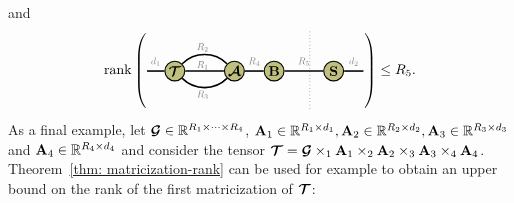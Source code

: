 and
$$
\rank
\left(\begin{tikzpicture}[baseline=-0.5ex]
    \tikzset{tensor/.style = {minimum size = 0.5cm,shape = circle,thick,draw=black,inner sep = 0pt}, edge/.style = {thick,line width=.4mm},every loop/.style={}}
    \def\x{6}
    \def\y{0} \node[tensor,fill=green!50!red!50!white] (T) at (\x+1,\y) {$\Tt$};
    \node[tensor,fill=green!50!red!50!white] (A) at (\x+2.5,\y) {$\At$};
    \node[tensor,fill=green!50!red!50!white] (B) at (\x+3.5,\y) {$\Bb$};
      \node[tensor,fill=green!50!red!50!white] (S) at (\x+5,\y) {$\Sb$};
    \draw[edge] (T) -- (\x+0.3,\y)node [midway,above] {\scalebox{0.7}{\dimcolor{$d_1$}}};
     \draw[edge] (T) -- (A);
    \draw[edge] (A) -- (B)node [midway,above] {\scalebox{0.7}{\dimcolor{$R_4$}}};
    \draw[edge] (T) to [out=-45,in=-135] (A);
    \draw[edge] (T) to [out=45,in=135] (A);
    \node[draw=none] () at (\x+1.7,\y+0.15) {\scalebox{0.7}{\dimcolor{$R_1$}}};
    \node[draw=none] () at (\x+1.7,\y+0.6) {\scalebox{0.7}{\dimcolor{$R_2$}}};
    \node[draw=none] () at (\x+1.7,\y-0.6) {\scalebox{0.7}{\dimcolor{$R_3$}}};
    \draw[edge](B) -- (S) node [midway,above] {\scalebox{0.7}{\dimcolor{$R_5$}}};
    \draw[edge] (S) -- (\x+5.75,\y) node [midway,above] {\scalebox{0.7}{\dimcolor{$d_2$}}};
    \draw[dotted] (\x+4.4,\y+1) -- (\x+4.4,\y-1);
    \end{tikzpicture}\right)\leq R_5.
$$
As a final example, let $\bm{\mathcal{G}}\in\mathbb{R}^{R_1\times\cdots\times R_4}$, $\mathbf{A}_1\in\mathbb{R}^{R_1\times d_1}, \mathbf{A}_2\in\mathbb{R}^{R_2\times d_2},\mathbf{A}_3\in\mathbb{R}^{R_3\times d_3}$ and $\mathbf{A}_4\in\mathbb{R}^{R_4\times d_4}$ and consider the tensor $\bm{\mathcal{T}} = \bm{\mathcal{G}} \times_1 \mathbf{A}_1\times_2 \mathbf{A}_2\times_3 \mathbf{A}_3\times_4 \mathbf{A}_4$. Theorem~\ref{thm: matricization-rank} can be used for example to obtain an upper bound on the rank of the first matricization of $\bm{\mathcal{T}}$:
